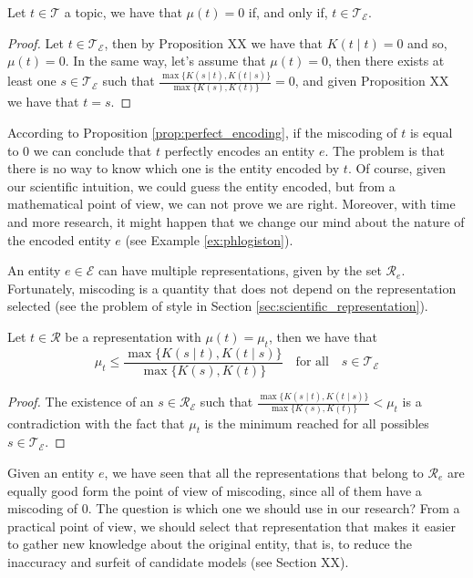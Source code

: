 \begin{proposition}\label{prop:perfect_encoding}
Let $t \in \mathcal{T}$ a topic, we have that $\mu(t) = 0$ if, and only if, $t \in \mathcal{T}_\mathcal{E}$.
\end{proposition}
\begin{proof}
Let $t \in \mathcal{T}_\mathcal{E}$, then by Proposition {\color{red} XX} we have that $K(t \mid t) = 0$ and so, $\mu(t) = 0$. In the same way, let's assume that $\mu(t) = 0$, then there exists at least one $s \in \mathcal{T}_\mathcal{E}$ such that $\frac{ \max\{ K(s \mid t), K(t \mid s) \} } { \max\{ K(s), K(t) \} } = 0$, and given Proposition {\color{red} XX} we have that $t = s$.
\end{proof}

According to Proposition \ref{prop:perfect_encoding}, if the miscoding of $t$ is equal to 0 we can conclude that $t$ perfectly encodes an entity $e$. The problem is that there is no way to know which one is the entity encoded by $t$. Of course, given our scientific intuition, we could guess the entity encoded, but from a mathematical point of view, we can not prove we are right. Moreover, with time and more research, it might happen that we change our mind about the nature of the encoded entity $e$ (see Example \ref{ex:phlogiston}).

An entity $e \in \mathcal{E}$ can have multiple representations, given by the set $\mathcal{R}_e$. Fortunately, miscoding is a quantity that does not depend on the representation selected (see the problem of style in Section \ref{sec:scientific_representation}).

\begin{proposition}
Let $t \in \mathcal{R}$ be a representation with $\mu(t) = \mu_t$, then we have that
\[
\mu_t \leq \frac{ \max\{ K(s \mid t), K(t \mid s) \} } { \max\{ K(s), K(t) \} } \quad \textrm{for all} \quad s \in \mathcal{T}_\mathcal{E}
\]
\end{proposition}
\begin{proof}
The existence of an $s \in \mathcal{R}_\mathcal{E}$ such that $\frac{ \max\{ K(s \mid t), K(t \mid s) \} } { \max\{ K(s), K(t) \} } < \mu_t$ is a contradiction with the fact that $\mu_t$ is the minimum reached for all possibles $s \in \mathcal{T}_\mathcal{E}$.
\end{proof}

Given an entity $e$, we have seen that all the representations that belong to $\mathcal{R}_e$ are equally good form the point of view of miscoding, since all of them have a miscoding of $0$. The question is which one we should use in our research? From a practical point of view, we should select that representation that makes it easier to gather new knowledge about the original entity, that is, to reduce the inaccuracy and surfeit of candidate models (see Section {\color{red} XX}).

